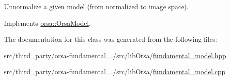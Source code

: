 Unnormalize a given model (from normalized to image space). 



Implements \hyperlink{classorsa_1_1OrsaModel_aeadc8d2c929a7740e84ce17396c1cc28}{orsa\+::\+Orsa\+Model}.



The documentation for this class was generated from the following files\+:\begin{DoxyCompactItemize}
\item 
src/third\+\_\+party/orsa-\/fundamental\+\_./src/lib\+Orsa/\hyperlink{fundamental__model_8hpp}{fundamental\+\_\+model.\+hpp}\item 
src/third\+\_\+party/orsa-\/fundamental\+\_./src/lib\+Orsa/\hyperlink{fundamental__model_8cpp}{fundamental\+\_\+model.\+cpp}\end{DoxyCompactItemize}
